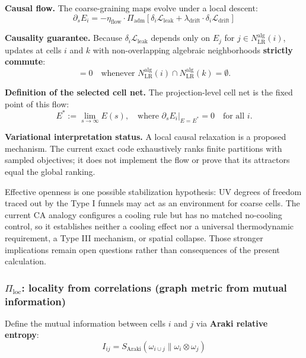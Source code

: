 \documentclass[reprint, amsmath, amssymb, aps, prd]{revtex4-2}
\begin{document}
\textbf{Causal flow.} The coarse-graining maps evolve under a local descent:
\begin{equation}
\partial_s E_i = -\eta_{\text{flow}} \cdot \Pi_{\text{adm}} \left[ \delta_i \mathcal{L}_{\text{leak}} + \lambda_{\text{drift}} \cdot \delta_i \mathcal{L}_{\text{drift}} \right]
\end{equation}

\textbf{Causality guarantee.} Because $\delta_i \mathcal{L}_{\text{leak}}$ depends only on $E_j$ for $j \in N_{\text{LR}}^{\text{alg}}(i)$, updates at cells $i$ and $k$ with non-overlapping algebraic neighborhoods \textbf{strictly commute}:
\begin{equation}
[ \partial_s E_i , \partial_s E_k ] = 0 \quad \text{whenever } N_{\text{LR}}^{\text{alg}}(i) \cap N_{\text{LR}}^{\text{alg}}(k) = \emptyset.
\end{equation}

\textbf{Definition of the selected cell net.} The projection-level cell net is the fixed point of this flow:
\begin{equation}
E^* := \lim_{s \to \infty} E(s), \quad \text{where } \left. \partial_s E_i \right|_{E=E^*} = 0 \quad \text{for all } i.
\end{equation}

\textbf{Variational interpretation status.} A local causal relaxation is a proposed mechanism. The current exact code exhaustively ranks finite partitions with sampled objectives; it does not implement the flow or prove that its attractors equal the global ranking.

Effective openness is one possible stabilization hypothesis: UV degrees of freedom
traced out by the Type I funnels may act as an environment for coarse cells. The
current CA analogy configures a cooling rule but has no matched no-cooling control,
so it establishes neither a cooling effect nor a universal thermodynamic requirement,
a Type III mechanism, or spatial collapse. Those stronger implications remain open
questions rather than consequences of the present calculation.

\subsubsection{\texorpdfstring{$\Pi_{\text{loc}}$}{Pi\_loc}: locality from correlations (graph metric from mutual information)}
Define the mutual information between cells $i$ and $j$ via \textbf{Araki relative entropy}:
\begin{equation}
I_{ij} = S_{\text{Araki}}(\omega_{i \cup j} \| \omega_i \otimes \omega_j)
\end{equation}
\end{document}
